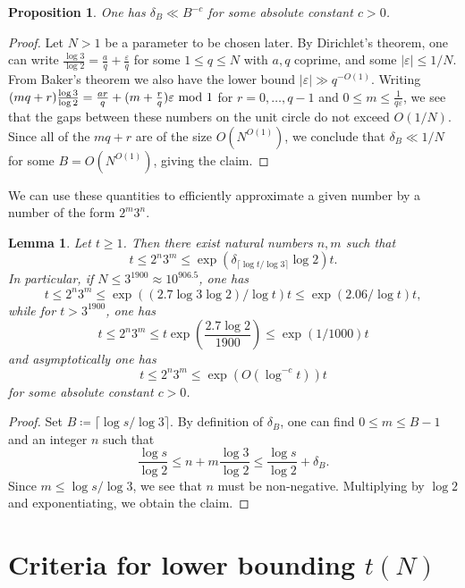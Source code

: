 \documentclass[12pt,a4paper,reqno]{amsart}
\numberwithin{equation}{section}
\theoremstyle{plain}
\newtheorem{proposition}[theorem]{Proposition}
\newtheorem{lemma}[theorem]{Lemma}
\theoremstyle{definition}
\newcommand\eps{\varepsilon}
\begin{document}
\begin{proposition}  One has $\delta_B \ll B^{-c}$ for some absolute constant $c>0$.
\end{proposition}

\begin{proof} Let $N > 1$ be a parameter to be chosen later.  By Dirichlet's theorem, one can write $\frac{\log 3}{\log 2} = \frac{a}{q} + \frac{\eps}{q}$ for some $1 \leq q \leq N$ with $a,q$ coprime, and some $|\eps| \leq 1/N$.  From Baker's theorem we also have the lower bound $|\eps| \gg q^{-O(1)}$.  Writing $(mq+r) \frac{\log 3}{\log 2} = \frac{ar}{q} + (m+\frac{r}{q})\eps \hbox{ mod } 1$ for $r=0,\dots,q-1$ and $0 \leq m \leq \frac{1}{q\eps}$, we see that the gaps between these numbers on the unit circle do not exceed $O(1/N)$.  Since all of the $mq+r$ are of the size $O(N^{O(1)})$, we conclude that $\delta_B \ll 1/N$ for some $B = O(N^{O(1)})$, giving the claim.
\end{proof}

We can use these quantities to efficiently approximate a given number by a number of the form $2^m 3^n$.

\begin{lemma}  Let $t \geq 1$.  Then there exist natural numbers $n,m$ such that
  $$ t \leq 2^n 3^m \leq \exp( \delta_{\lceil \log t/\log 3 \rceil} \log 2 ) t.$$
In particular, if $N \leq 3^{1900} \approx 10^{906.5}$, one has
$$ t \leq 2^n 3^m \leq \exp( (2.7 \log 3 \log 2) / \log t ) t \leq \exp(2.06/\log t) t,$$
while for $t > 3^{1900}$, one has
$$ t \leq 2^n 3^m \leq t \exp( \frac{2.7 \log 2}{1900} )
\leq  \exp( 1/1000 ) t$$
and asymptotically one has
$$ t \leq 2^n 3^m \leq  \exp( O(\log^{-c} t) ) t$$
for some absolute constant $c>0$.
\end{lemma}

\begin{proof}  Set $B \coloneqq \lceil \log s/\log 3 \rceil$.  By definition of $\delta_B$, one can find $0 \leq m \leq B-1$ and an integer $n$ such that 
$$ \frac{\log s}{\log 2} \leq n + m \frac{\log 3}{\log 2} \leq \frac{\log s}{\log 2} + \delta_B.$$
Since $m \leq \log s/\log 3$, we see that $n$ must be non-negative.  Multiplying by $\log 2$ and exponentiating, we obtain the claim.
\end{proof}

\section{Criteria for lower bounding \texorpdfstring{$t(N)$}{t(N)}}
\end{document}
